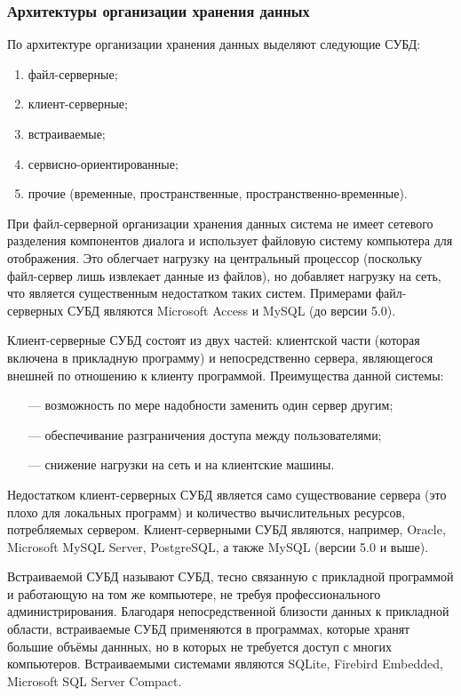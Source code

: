 \subsubsection{Архитектуры организации хранения данных}

По архитектуре организации хранения данных выделяют следующие СУБД:

\begin{enumerate}[label=\arabic*)]
	\item файл-серверные;
	\item клиент-серверные;
	\item встраиваемые;
	\item сервисно-ориентированные;
	\item прочие (временные, пространственные, пространственно-временные).
\end{enumerate}

При файл-серверной организации хранения данных система не имеет сетевого разделения компонентов диалога и использует файловую систему компьютера для отображения. 
Это облегчает нагрузку на центральный процессор (поскольку файл-сервер лишь извлекает данные из файлов), но добавляет нагрузку на сеть, что является существенным недостатком таких систем.
Примерами  файл-серверных СУБД являются  Microsoft Access и MySQL (до версии 5.0).

Клиент-серверные СУБД состоят из двух частей: клиентской части (которая включена в прикладную программу) и непосредственно сервера, являющегося внешней по отношению к клиенту программой. Преимущества данной системы:
\begin{itemize}[leftmargin=1.6\parindent]
	\item[---] возможность по мере надобности заменить один сервер другим;
	\item[---] обеспечивание разграничения доступа между пользователями;
	\item[---] снижение нагрузки на сеть и на клиентские машины.
\end{itemize}

Недостатком клиент-серверных СУБД является само существование сервера (это плохо для локальных программ) и количество вычислительных ресурсов, потребляемых сервером.
Клиент-серверными СУБД являются, например, Oracle, Microsoft MySQL Server, PostgreSQL, а также MySQL (версии 5.0 и выше).

Встраиваемой СУБД называют СУБД, тесно связанную с прикладной программой и работающую на том же компьютере, не требуя профессионального администрирования. 
Благодаря непосредственной близости данных к прикладной области, встраиваемые СУБД применяются в программах, которые хранят большие объёмы даннных, но в которых не требуется доступ с многих компьютеров.
Встраиваемыми системами являются SQLite, Firebird Embedded, Microsoft SQL Server Compact.



